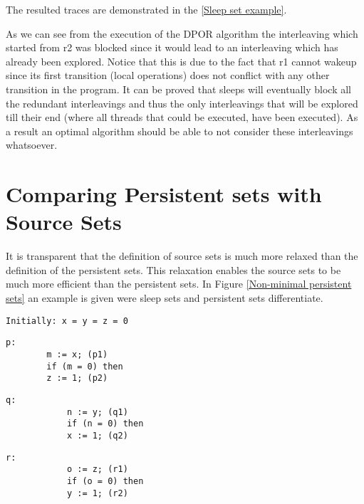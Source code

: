 The resulted traces are demonstrated in the \ref{Sleep set example}.


As we can see from the execution of the DPOR algorithm the interleaving which started from r2 was blocked since it would lead to an interleaving which
has already been explored. Notice that this is due to the fact that r1 cannot wakeup since its first transition (local operations) does not conflict with any other transition
in the program. 
It can be proved \cite{Godefroid1996} that sleeps will eventually block all the redundant interleavings and thus the only interleavings that will be explored till their end (where all threads that could be executed, have been executed).
As a result an optimal algorithm should be able to not consider these interleavings whatsoever.

\section{Comparing Persistent sets with Source Sets}

It is transparent that the definition of source sets is much more relaxed than the definition of the persistent sets. 
This relaxation enables the source sets to be much more efficient than the persistent sets. In Figure \ref{Non-minimal persistent sets}
an example is given were sleep sets and persistent sets differentiate.

\begin{figure*}
    \begin{lstlisting}[frame=none,numbers=none]
        Initially: x = y = z = 0 
    \end{lstlisting}
    \begin{minipage}{0.3\textwidth}
      \begin{lstlisting}[frame=none, numbers=none]
        p:
        m := x; (p1)
        if (m = 0) then
        z := 1; (p2)
      \end{lstlisting}
    \end{minipage}
    \begin{minipage}{0.3\textwidth}
        \begin{lstlisting}[frame=none, numbers=none]
            q:
            n := y; (q1)
            if (n = 0) then
            x := 1; (q2)
        \end{lstlisting}
      \end{minipage}
      \begin{minipage}{0.3\textwidth}
        \begin{lstlisting}[frame=none, numbers=none]
            r:
            o := z; (r1)
            if (o = 0) then
            y := 1; (r2)
        \end{lstlisting}
      \end{minipage}
      \caption{Program with non-minimal persistent sets}
      \label{Non-minimal persistent sets}
  \end{figure*}

